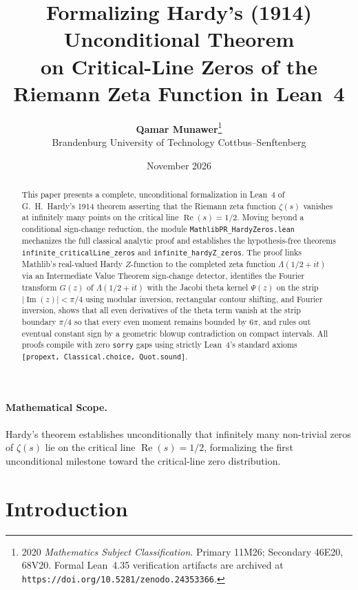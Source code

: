\documentclass[11pt,a4paper]{article}
\title{\textbf{Formalizing Hardy's (1914) Unconditional Theorem\\on Critical-Line Zeros of the Riemann Zeta Function in Lean~4}}
\author{\textbf{Qamar Munawer}\thanks{2020 \emph{Mathematics Subject Classification}. Primary 11M26; Secondary 46E20, 68V20. Formal Lean~4.35 verification artifacts are archived at \texttt{https://doi.org/10.5281/zenodo.24353366}.}\\[0.3em]
\small Brandenburg University of Technology Cottbus--Senftenberg}
\date{November 2026}
\theoremstyle{definition}
\begin{document}
\maketitle

\begin{abstract}
This paper presents a complete, unconditional formalization in Lean~4 of G.~H.~Hardy's 1914 theorem asserting that the Riemann zeta function $\zeta(s)$ vanishes at infinitely many points on the critical line $\operatorname{Re}(s) = 1/2$. Moving beyond a conditional sign-change reduction, the module \texttt{MathlibPR\_\allowbreak HardyZeros.lean} mechanizes the full classical analytic proof and establishes the hypothesis-free theorems \texttt{infinite\_\allowbreak criticalLine\_\allowbreak zeros} and \texttt{infinite\_\allowbreak hardyZ\_\allowbreak zeros}. The proof links Mathlib's real-valued Hardy $Z$-function to the completed zeta function $\Lambda(1/2+it)$ via an Intermediate Value Theorem sign-change detector, identifies the Fourier transform $G(z)$ of $\Lambda(1/2+it)$ with the Jacobi theta kernel $\Psi(z)$ on the strip $|\operatorname{Im}(z)| < \pi/4$ using modular inversion, rectangular contour shifting, and Fourier inversion, shows that all even derivatives of the theta term vanish at the strip boundary $\pi/4$ so that every even moment remains bounded by $6\pi$, and rules out eventual constant sign by a geometric blowup contradiction on compact intervals. All proofs compile with zero \texttt{sorry} gaps using strictly Lean~4's standard axioms \texttt{[propext, Classical.choice, Quot.sound]}.
\end{abstract}

\paragraph{Mathematical Scope.}
Hardy's theorem establishes unconditionally that infinitely many non-trivial zeros of $\zeta(s)$ lie on the critical line $\operatorname{Re}(s) = 1/2$, formalizing the first unconditional milestone toward the critical-line zero distribution.

\section{Introduction}
\end{document}
